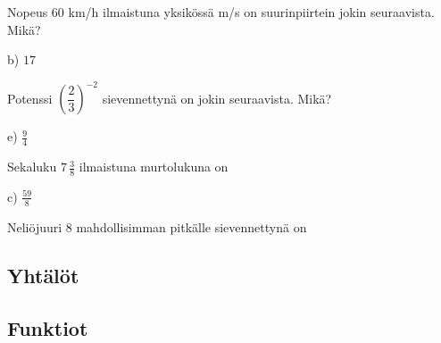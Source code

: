\begin{tehtava}
Nopeus 60 km/h ilmaistuna yksikössä m/s on suurinpiirtein jokin seuraavista. Mikä?
\begin{alakohdat}
\end{alakohdat}
	\begin{vastaus}
	 b) $17$
	\end{vastaus}
\end{tehtava}

\begin{tehtava}
Potenssi $\left( \dfrac{2}{3} \right)^{-2}$ sievennettynä on jokin seuraavista. Mikä?
\begin{alakohdat}
\end{alakohdat}
\begin{vastaus}
e) $\frac{9}{4}$
\end{vastaus}
\end{tehtava}

\begin{tehtava}
Sekaluku $7\,\frac{3}{8}$ ilmaistuna murtolukuna on
\begin{alakohdat}
\end{alakohdat}
    \begin{vastaus}
	 c) $\frac{59}{8}$
    \end{vastaus}
\end{tehtava}

\begin{tehtava}
Neliöjuuri 8 mahdollisimman pitkälle sievennettynä on
\begin{alakohdat}
\end{alakohdat}
\end{tehtava}

\subsection*{Yhtälöt}

\subsection*{Funktiot}

